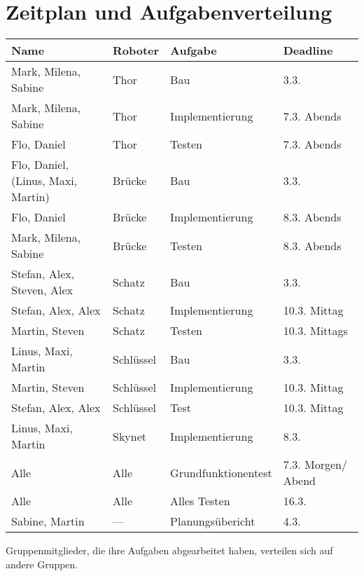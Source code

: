 \documentclass[a4paper]{scrartcl}
\begin{document}
	\section{Zeitplan und Aufgabenverteilung}
	\begin{table}[H]
		\begin{tabularx}{\linewidth}{|l|l|l|l|}
			\hline
			\sfb Name & \sfb Roboter & \sfb Aufgabe & \sfb Deadline \\
			\hline
			Mark, Milena, Sabine & Thor & Bau & 3.3. \\
			Mark, Milena, Sabine & Thor & Implementierung & 7.3. Abends \\
			Flo, Daniel & Thor & Testen & 7.3. Abends \\
			Flo, Daniel, (Linus, Maxi, Martin) & Brücke & Bau & 3.3. \\
			Flo, Daniel & Brücke & Implementierung & 8.3. Abends \\
			Mark, Milena, Sabine & Brücke & Testen & 8.3. Abends \\
			Stefan, Alex, Steven, Alex & Schatz & Bau & 3.3. \\
			Stefan, Alex, Alex & Schatz & Implementierung & 10.3. Mittag \\
			Martin, Steven & Schatz & Testen & 10.3. Mittags \\
			Linus, Maxi, Martin & Schlüssel & Bau & 3.3. \\
			Martin, Steven & Schlüssel & Implementierung & 10.3. Mittag \\
			Stefan, Alex, Alex & Schlüssel & Test & 10.3. Mittag \\
			Linus, Maxi, Martin & Skynet & Implementierung & 8.3. \\
			Alle & Alle & Grundfunktionentest & 7.3. Morgen/ Abend \\
			Alle & Alle & Alles Testen & 16.3. \\
			Sabine, Martin & --- & Planungsübericht & 4.3. \\
			\hline
		\end{tabularx}
	\end{table}
	Gruppenmitglieder, die ihre Aufgaben abgearbeitet haben, verteilen sich auf andere Gruppen.
\end{document}

